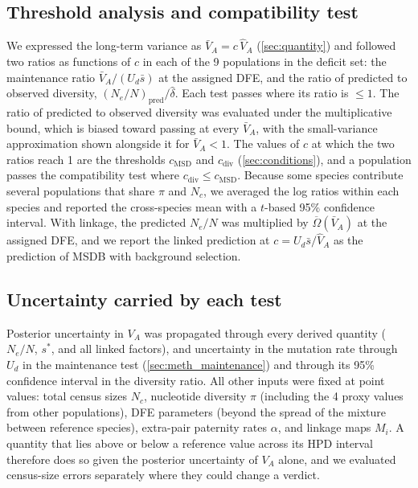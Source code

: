 \documentclass{article}
\begin{document}
\subsection{Threshold analysis and compatibility test}\label{sec:rescaling_methods}
We expressed the long-term variance as $\bar{V}_A = c\,\hat{V}_A$ (\autoref{sec:quantity}) and followed two ratios as functions of $c$ in each of the 9 populations in the deficit set: the maintenance ratio $\bar{V}_A/(U_d\bar{s})$ at the assigned DFE, and the ratio of predicted to observed diversity, $(N_e/N)_\text{pred}/\hat{\delta}$. Each test passes where its ratio is $\le 1$. The ratio of predicted to observed diversity was evaluated under the multiplicative bound, which is biased toward passing at every $\bar{V}_A$, with the small-variance approximation shown alongside it for $\bar{V}_A < 1$. The values of $c$ at which the two ratios reach 1 are the thresholds $c_\text{MSD}$ and $c_\text{div}$ (\autoref{sec:conditions}), and a population passes the compatibility test where $c_\text{div} \le c_\text{MSD}$. Because some species contribute several populations that share $\pi$ and $N_c$, we averaged the log ratios within each species and reported the cross-species mean with a $t$-based 95\% confidence interval. With linkage, the predicted $N_e/N$ was multiplied by $\overline{\Omega}(\bar{V}_A)$ at the assigned DFE, and we report the linked prediction at $c = U_d\bar{s}/\hat{V}_A$ as the prediction of MSDB with background selection.

\subsection{Uncertainty carried by each test}\label{sec:uncertainty_methods}
Posterior uncertainty in $V_A$ was propagated through every derived quantity ($N_e/N$, $s^*$, and all linked factors), and uncertainty in the mutation rate through $U_d$ in the maintenance test (\autoref{sec:meth_maintenance}) and through its 95\% confidence interval in the diversity ratio. All other inputs were fixed at point values: total census sizes $N_c$, nucleotide diversity $\pi$ (including the 4 proxy values from other populations), DFE parameters (beyond the spread of the mixture between reference species), extra-pair paternity rates $\alpha$, and linkage maps $M_i$. A quantity that lies above or below a reference value across its HPD interval therefore does so given the posterior uncertainty of $V_A$ alone, and we evaluated census-size errors separately where they could change a verdict.
\end{document}
